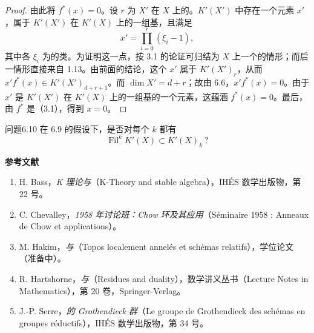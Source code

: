 \begin{proof}
由此将 $f^*(x)=0$。设 $r$ 为 $X'$ 在 $X$ 上的。$K'(X')$ 中存在一个元素 $x'$，属于 $K'(X')$ 在 $K'(X)$ 上的一组基，且满足
\[
x'=\prod_{i=0}^r(\xi_i-1),
\]
其中各 $\xi_i$ 为的类。为证明这一点，按 3.1 的论证可归结为 $X$ 上一个的情形；而后一情形直接来自 1.13。由前面的结论，这个 $x'$ 属于 $K'(X')_r$，从而 $x'f^*(x)\in K'(X')_{d+r+1}$。而 $\dim X'=d+r$；故由 6.6，$x'f^*(x)=0$。由于 $x'$ 是 $K'(X')$ 在 $K'(X)$ 上的一组基的一个元素，这蕴涵 $f^*(x)=0$。最后，由 $f^*$ 是（3.1），得到 $x=0$。
\end{proof}

\begin{SGAresult}{问题}{6.10}
在 6.9 的假设下，是否对每个 $k$ 都有
\[
\operatorname{Fil}^kK'(X)\subset K'(X)_k\ ?
\]
\end{SGAresult}

\bigskip
\noindent\textbf{参考文献}
\begin{enumerate}
\item[{[1]}] H. Bass，\textit{K 理论与}（K-Theory and stable algebra），IHÉS 数学出版物，第 22 号。
\item[{[2]}] C. Chevalley，\textit{1958 年讨论班：Chow 环及其应用}（Séminaire 1958 : Anneaux de Chow et applications）。
\item[{[3]}] M. Hakim，\textit{与}（Topos localement annelés et schémas relatifs），学位论文（准备中）。
\item[{[4]}] R. Hartshorne，\textit{与}（Residues and duality），数学讲义丛书（Lecture Notes in Mathematics），第 20 卷，Springer-Verlag。
\item[{[5]}] J.-P. Serre，\textit{的 Grothendieck 群}（Le groupe de Grothendieck des schémas en groupes réductifs），IHÉS 数学出版物，第 34 号。
\end{enumerate}
